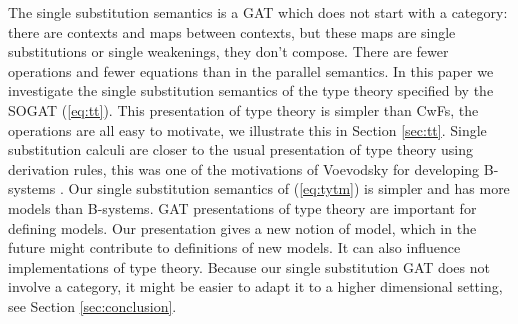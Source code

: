 \documentclass[sigplan,10pt,anonymous,review]{acmart}\settopmatter{printfolios=true,printccs=false,printacmref=false}
\begin{document}
The single substitution semantics is a GAT which does not start with a
category: there are contexts and maps between contexts, but these maps
are single substitutions or single weakenings, they don't
compose. There are fewer operations and fewer equations than in the
parallel semantics. In this paper we investigate the single
substitution semantics of the type theory specified by the SOGAT
(\ref{eq:tt}). This presentation of type theory is simpler than CwFs,
the operations are all easy to motivate, we illustrate this in Section
\ref{sec:tt}. Single substitution calculi are closer to the usual
presentation of type theory using derivation rules, this was one of
the motivations of Voevodsky for developing B-systems
\cite{AHRENS_EMMENEGGER_NORTH_RIJKE_2023}. Our single substitution
semantics of (\ref{eq:tytm}) is simpler and has more models than
B-systems. GAT presentations of type theory are important for defining
models. Our presentation gives a new notion of model, which in the
future might contribute to definitions of new models. It can also
influence implementations of type theory. Because our single
substitution GAT does not involve a category, it might be easier to
adapt it to a higher dimensional setting, see Section
\ref{sec:conclusion}.
\end{document}
